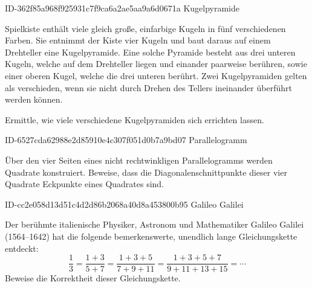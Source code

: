 \begin{exercise}
      {ID-362f85a968f925931c7f9ca6a2ae5aa9a6d0671a}
      {Kugelpyramide}
  \ifproblem\problem\par
    \xxb{} Spielkiste enthält viele gleich große,
    einfarbige Kugeln in fünf verschiedenen Farben.
    Sie entnimmt der Kiste vier Kugeln und baut
    daraus auf einem Drehteller eine Kugelpyramide.
    Eine solche Pyramide besteht aus drei unteren
    Kugeln, welche auf dem Drehteller liegen und
    einander paarweise berühren, sowie einer oberen
    Kugel, welche die drei unteren berührt. Zwei
    Kugelpyramiden gelten als verschieden, wenn
    sie nicht durch Drehen des Tellers ineinander
    überführt werden können.\par
    Ermittle, wie viele verschiedene Kugelpyramiden
    sich errichten lassen.
  \fi
\end{exercise}

\begin{exercise}
      {ID-6527cda62988e2d85910e4c307f051d0b7a9bd07}
      {Parallelogramm}
  \ifproblem\problem\par
    Über den vier Seiten eines nicht rechtwinkligen
    Parallelogramms werden Quadrate konstruiert.
    Beweise, dass die Diagonalenschnittpunkte dieser
    vier Quadrate Eckpunkte eines Quadrates sind.
  \fi
\end{exercise}

\begin{exercise}
      {ID-cc2e058d13d51c4d2d86b2068a40d8a453800b95}
      {Galileo Galilei}
  \ifproblem\problem\par
    Der berühmte italienische Physiker, Astronom
    und Mathematiker Galileo Galilei (1564--1642)
    hat die folgende bemerkenswerte, unendlich lange
    Gleichungskette entdeckt:
    \begin{equation*}
      \frac{1}{3}
      =\frac{1+3}{5+7}
      =\frac{1+3+5}{7+9+11}
      =\frac{1+3+5+7}{9+11+13+15}
      =\dotsb
    \end{equation*}
    Beweise die Korrektheit dieser Gleichungskette.
  \fi
\end{exercise}


